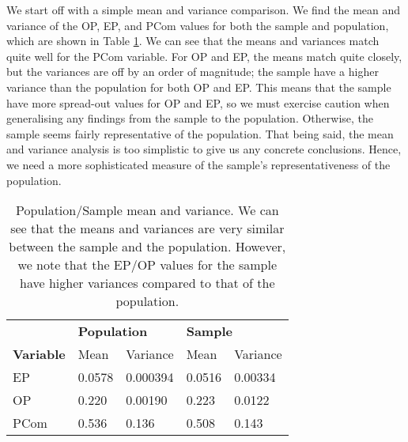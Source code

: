 \documentclass[11pt]{article}
\begin{document}
We start off with a simple mean and variance comparison.  We find the mean and variance of the OP, EP, and PCom values for both the sample and population, which are shown in Table \ref{tab:mean and variance}. We can see that the means and variances match quite well for the PCom variable. For OP and EP, the means match quite closely, but the variances are off by an order of magnitude; the sample have a higher variance than the population for both OP and EP. This means that the sample have more spread-out values for OP and EP, so we must exercise caution when generalising any findings from the sample to the population. Otherwise, the sample seems fairly representative of the population. That being said, the mean and variance analysis is too simplistic to give us any concrete conclusions. Hence, we need a more sophisticated measure of the sample's representativeness of the population.

\begin{table}[]
	\centering
	\begin{tabular}{l|ll|ll}
					  & \multicolumn{2}{l|}{\textbf{Population}} & \multicolumn{2}{l}{\textbf{Sample}} \\ \cline{2-5} 
	\textbf{Variable} & Mean               & Variance            & Mean            & Variance          \\ \hline
	EP                & 0.0578             & 0.000394            & 0.0516          & 0.00334           \\ \hline
	OP                & 0.220              & 0.00190             & 0.223           & 0.0122            \\ \hline
	PCom              & 0.536              & 0.136               & 0.508           & 0.143            
	\end{tabular}
	\caption{Population/Sample mean and variance. We can see that the means and variances are very similar between the sample and the population. However, we note that the EP/OP values for the sample have higher variances compared to that of the population.}
	\label{tab:mean and variance}
\end{table}
\end{document}
